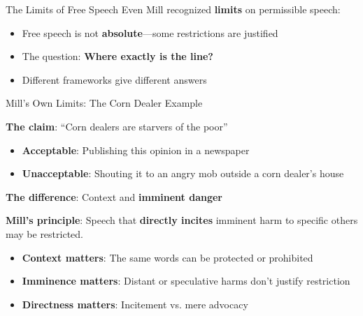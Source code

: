 ﻿\documentclass[aspectratio=169,11pt]{beamer}
\begin{document}
\begin{frame}{The Limits of Free Speech}
Even Mill recognized \textbf{limits} on permissible speech:

\begin{itemize}
    \item Free speech is not \textbf{absolute}---some restrictions are justified
    \item The question: \textbf{Where exactly is the line?}
    \item Different frameworks give different answers
\end{itemize}

\vspace{0.4cm}
\begin{center}
\end{center}
\end{frame}

\begin{frame}{Mill's Own Limits: The Corn Dealer Example}
\begin{casestudybox}
\textbf{The claim}: ``Corn dealers are starvers of the poor''

\begin{itemize}
    \item \textbf{Acceptable}: Publishing this opinion in a newspaper
    \item \textbf{Unacceptable}: Shouting it to an angry mob outside a corn dealer's house
\end{itemize}

\textbf{The difference}: Context and \textbf{imminent danger}
\end{casestudybox}

\vspace{0.3cm}
\textbf{Mill's principle}: Speech that \textbf{directly incites} imminent harm to specific others may be restricted.

\vspace{0.2cm}
\begin{itemize}
    \item \textbf{Context matters}: The same words can be protected or prohibited
    \item \textbf{Imminence matters}: Distant or speculative harms don't justify restriction
    \item \textbf{Directness matters}: Incitement vs. mere advocacy
\end{itemize}
\end{frame}
\end{document}

